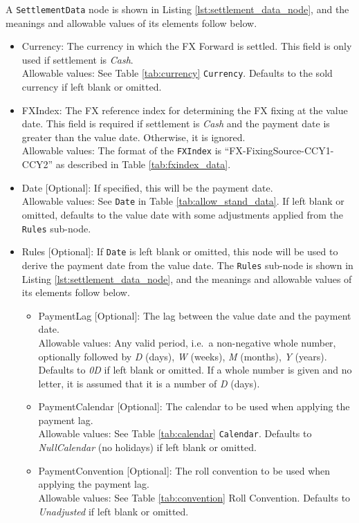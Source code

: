 A \lstinline!SettlementData! node is shown in Listing \ref{lst:settlement_data_node}, and the meanings and allowable values of its elements follow below.

\begin{itemize}
\item Currency: The currency in which the FX Forward is settled. This field is only used if settlement is \emph{Cash}. \\
Allowable values:  See Table \ref{tab:currency} \lstinline!Currency!. Defaults to the sold currency if left blank or omitted.
\item FXIndex: The FX reference index for determining the FX fixing at the value date. This field is required if settlement is \emph{Cash}
and the payment date is greater than the value date. Otherwise, it is ignored. \\
Allowable values: The format of the \lstinline!FXIndex! is ``FX-FixingSource-CCY1-CCY2'' as described in Table \ref{tab:fxindex_data}.
\item Date [Optional]: If specified, this will be the payment date. \\
Allowable values: See \lstinline!Date! in Table \ref{tab:allow_stand_data}. If left blank or omitted, defaults to the value date with some adjustments applied
from the \lstinline!Rules! sub-node.
\item Rules [Optional]: If \lstinline!Date! is left blank or omitted, this node will be used to derive the payment date from the value date.
The \lstinline!Rules! sub-node is shown in Listing \ref{lst:settlement_data_node}, and the meanings and allowable values of its elements follow below.
  \begin{itemize}
	\item PaymentLag [Optional]: The lag between the value date and the payment date. \\
	Allowable values: Any valid period, i.e.\ a non-negative whole number, optionally followed by \emph{D} (days), \emph{W} (weeks), \emph{M} (months),
  \emph{Y} (years). Defaults to \emph{0D} if left blank or omitted. If a whole number is given and no letter, it is assumed that it is a number of  \emph{D} (days).
	\item PaymentCalendar [Optional]: The calendar to be used when applying the payment lag. \\
	Allowable values: See Table \ref{tab:calendar} \lstinline!Calendar!. Defaults to \emph{NullCalendar} (no holidays) if left blank or omitted.
	\item PaymentConvention [Optional]: The roll convention to be used when applying the payment lag. \\
	Allowable values: See Table \ref{tab:convention} Roll Convention. Defaults to \emph{Unadjusted} if left blank or omitted.
  \end{itemize}
\end{itemize}

